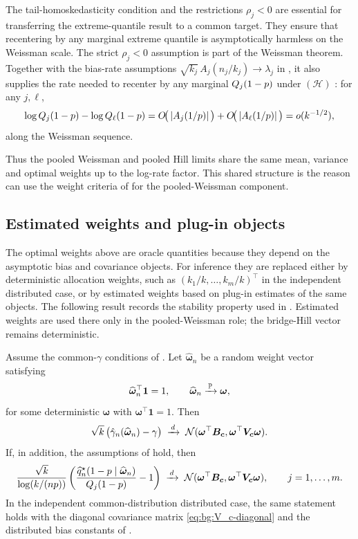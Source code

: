 The tail-homoskedasticity condition and the restrictions \(\rho_j<0\) are
essential for transferring the extreme-quantile result to a common target. They
ensure that recentering by any marginal extreme quantile is asymptotically
harmless on the Weissman scale.
The strict $\rho_j<0$ assumption is part of the Weissman theorem.
Together with the bias-rate assumptions
$\sqrt{k_j}\,A_j(n_j/k_j)\to\lambda_j$ in
, it also supplies the rate needed to recenter
by any marginal $Q_j(1-p)$ under $(\mathcal H)$
\parencite[Supplementary Material, Lemma~B.2]{DaouiaPadoanStupfler2021}: for any
$j,\ell$,
\[
  \log Q_j(1-p)-\log Q_\ell(1-p)
  =
  O\!\big(\left\lvert A_j(1/p) \right\rvert\big)
  +
  O\!\big(\left\lvert A_\ell(1/p) \right\rvert\big)
  =
  o(k^{-1/2}),
\]
along the Weissman sequence.

Thus the pooled Weissman and pooled Hill limits share the same mean,
variance and optimal weights up to the log-rate factor. This shared
structure is the reason  can use the weight
criteria of \textcite{DaouiaPadoanStupfler2021} for the pooled-Weissman
component.

\subsection{Estimated weights and plug-in objects}
\label{sec:bg:estimated-pooling}

The optimal weights above are oracle quantities because they depend on
the asymptotic bias and covariance objects. For inference they are
replaced either by deterministic allocation weights, such as
\((k_1/k,\ldots,k_m/k)^\top\) in the independent distributed case, or
by estimated weights based on plug-in estimates of the same objects.
The following result records the stability property used in
. Estimated weights are used there only in the
pooled-Weissman role; the bridge-Hill vector remains deterministic.

\begin{proposition}
\label{prop:bg:estimated-pooling-weights}
Assume the common-\(\gamma\) conditions of . Let
\(\widehat{\bm\omega}_n\) be a random weight vector satisfying
\[
  \widehat{\bm\omega}_n^\top\bm 1=1,
  \qquad
  \widehat{\bm\omega}_n\xrightarrow{\,\operatorname{\mathbb{P}}\,}\bm\omega,
\]
for some deterministic \(\bm\omega\) with
\(\bm\omega^\top\bm 1=1\). Then
\[
  \sqrt{k}\,\big(\hat\gamma_n(\widehat{\bm\omega}_n)-\gamma\big)
  \;\xrightarrow{\,d\,}\;
  \mathcal N(\bm\omega^\top\bm{B}_{\bm{c}},\bm\omega^\top\bm{V}_{\bm{c}}\bm\omega).
\]
If, in addition, the assumptions of  hold,
then
\[
  \frac{\sqrt{k}}{\log(k/(np))}
  \left(
    \frac{\widehat{q}^{\star}_n(1-p\mid\widehat{\bm\omega}_n)}
         {Q_j(1-p)}
    -1
  \right)
  \;\xrightarrow{\,d\,}\;
  \mathcal N(\bm\omega^\top\bm{B}_{\bm{c}},\bm\omega^\top\bm{V}_{\bm{c}}\bm\omega),
  \qquad j=1,\ldots,m.
\]
In the independent common-distribution distributed case, the same
statement holds with the diagonal covariance matrix
\eqref{eq:bg:V_c-diagonal} and the distributed bias constants of
\textcite[Corollary~5]{DaouiaPadoanStupfler2021}.
\end{proposition}

